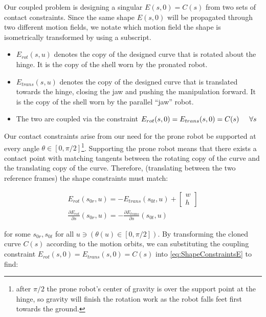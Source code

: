 \documentclass[letterpaper]{report}
\begin{document}
Our coupled problem is designing a singular $E(s,0) = C(s)$ from two sets of contact constraints.
Since the same shape $E(s,0)$ will be propagated through two different motion fields, we notate which motion field the shape is isometrically transformed by using a subscript.
\begin{itemize}
  \item $E_{rot}(s,u)$ denotes the copy of the designed curve that is rotated about the hinge. It is the copy of the shell worn by the pronated robot.
  \item$E_{trans}(s,u)$ denotes the copy of the designed curve that is translated towards the hinge, closing the jaw and pushing the manipulation forward. It is the copy of the shell worn by the parallel ``jaw'' robot.
  \item The two are coupled via the constraint $E_{rot}(s,0) = E_{trans}(s,0) = C(s) \hspace{5mm} \forall s$
\end{itemize}

Our contact constraints arise from our need for the prone robot be supported at every angle $\theta \in [0,\pi/2]$\footnote{after $\pi/2$ the prone robot's center of gravity is over the support point at the hinge, so gravity will finish the rotation work as the robot falls feet first towards the ground.}.
Supporting the prone robot means that there exists a contact point with matching tangents between the rotating copy of the curve and the translating copy of the curve.
Therefore, (translating between the two reference frames) the shape constraints must match:

\begin{align}
  E_{rot}(s_{0r},u) = -E_{trans}(s_{0t},u) +\begin{bmatrix}w \\ h\end{bmatrix} \\
  \frac{\partial E_{rot}}{\partial s}(s_{0r},u) = - \frac{\partial E_{trans}}{\partial s}(s_{0t},u)
  \label{eq:ShapeConstraintsE}
\end{align}

for some $s_{0r},s_{0t}$ for all $u \ni (\theta(u) \in [0,\pi/2])$.
By transforming the cloned curve $C(s)$ according to the motion orbits, we can substituting the coupling constraint $E_{rot}(s,0) = E_{trans}(s,0) = C(s)$ into \ref{eq:ShapeConstraintsE} to find:
\end{document}
